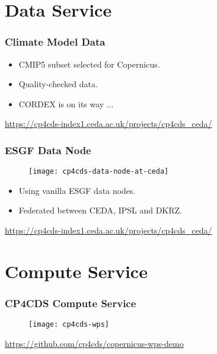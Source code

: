\documentclass{beamer}
\begin{document}
\section{Data Service}

\begin{frame}
\frametitle<presentation>{Climate Model Data}

  \begin{itemize}
    \item CMIP5 subset selected for Copernicus.
    \item Quality-checked data.
    \item CORDEX is on its way ...
  \end{itemize}

  \centering
  \footnotesize{\url{https://cp4cds-index1.ceda.ac.uk/projects/cp4cds_ceda/}}

\end{frame}

\begin{frame}
\frametitle<presentation>{ESGF Data Node}

  \begin{figure}[ht]
    \centering
    \texttt{[image: cp4cds-data-node-at-ceda]}
  \end{figure}

  \begin{itemize}
    \item Using vanilla ESGF data nodes.
    \item Federated between CEDA, IPSL and DKRZ.
  \end{itemize}

  \centering
  \footnotesize{\url{https://cp4cds-index1.ceda.ac.uk/projects/cp4cds_ceda/}}

\end{frame}

\section{Compute Service}

\begin{frame}
\frametitle<presentation>{CP4CDS Compute Service}

  \begin{figure}[ht]
    \centering
    \texttt{[image: cp4cds-wps]}
  \end{figure}

  \centering
  \footnotesize{\url{https://github.com/cp4cds/copernicus-wps-demo}}

\end{frame}
\end{document}
